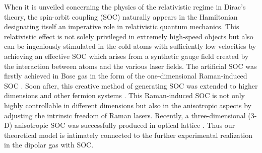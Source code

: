 \documentclass[twocolumn,english,pra,superscriptaddress]{revtex4-1}
\begin{document}
 When it is unveiled concerning the physics of the relativistic regime in Dirac's theory, the spin-orbit coupling (SOC) naturally appears in the Hamiltonian designating itself an imperative role in relativistic quantum mechanics. This relativistic effect is not solely privileged in extremely high-speed objects but also can be ingeniously stimulated in the cold atoms with sufficiently low velocities by achieving an effective SOC \cite{Victor2011,PhysRevLett.109.095301,science2016,PhysRevLett.117.235304,huang2016experimental,PhysRevX.6.031022,wang2021realization,zhang2016properties,lu2022dynamics,jiao2022bose,yang2022dynamics} which arises from a synthetic gauge field created by the interaction between atoms and the various laser fields. The artificial SOC was firstly achieved in Bose gas in the form of the one-dimensional Raman-induced SOC \cite{Victor2011}. Soon after, this creative method of generating SOC was extended to higher dimensions and other fermion systems \cite{PhysRevLett.109.095301,science2016,PhysRevLett.117.235304,huang2016experimental,wang2021realization}. This Raman-induced SOC is not only highly controllable in different dimensions but also in the anisotropic aspects by adjusting the intrinsic freedom of Raman lasers. Recently, a three-dimensional (3-D) anisotropic SOC was successfully produced in optical lattice \cite{wang2021realization}. Thus our theoretical model is intimately connected to the further experimental realization in the dipolar gas with SOC. \par
\end{document}
